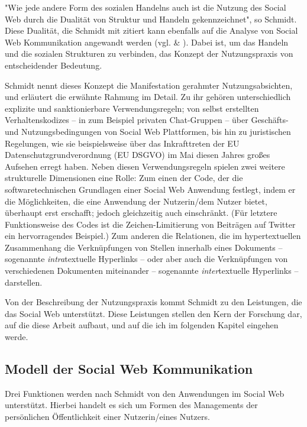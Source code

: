 "Wie jede andere Form des sozialen Handelns auch ist die Nutzung des Social Web durch die Dualität von Struktur und Handeln gekennzeichnet", so Schmidt. Diese Dualität, die Schmidt mit \cite{giddens1988konstitution} zitiert kann ebenfalls auf die Analyse von Social Web Kommunikation angewandt werden (vgl. \cite{schmidt2006social} \& \cite{schmidt2006weblogs}). Dabei ist, um das Handeln und die sozialen Strukturen zu verbinden, das Konzept der Nutzungspraxis von entscheidender Bedeutung.

Schmidt nennt dieses Konzept die Manifestation gerahmter Nutzungsabsichten, und erläutert die erwähnte Rahmung im Detail. Zu ihr gehören unterschiedlich explizite und sanktionierbare Verwendungsregeln; von selbst erstellten Verhaltenskodizes -- in zum Beispiel privaten Chat-Gruppen -- über Geschäfts- und Nutzungsbedingungen von Social Web Plattformen, bis hin zu juristischen Regelungen, wie sie beispielsweise über das Inkrafttreten der EU Datenschutzgrundverordnung (EU DSGVO) \cite{eurlex2016} im Mai diesen Jahres großes Aufsehen erregt haben. Neben diesen Verwendungsregeln spielen zwei weitere strukturelle Dimensionen eine Rolle: Zum einen der Code, der die softwaretechnischen Grundlagen einer Social Web Anwendung festlegt, indem er die Möglichkeiten, die eine Anwendung der Nutzerin/dem Nutzer bietet, überhaupt erst erschafft; jedoch gleichzeitig auch einschränkt. (Für letztere Funktionsweise des Codes ist die Zeichen-Limitierung von Beiträgen auf Twitter ein hervorragendes Beispiel.) Zum anderen die Relationen, die im hypertextuellen Zusammenhang die Verknüpfungen von Stellen innerhalb eines Dokuments -- sogenannte \textit{intra}textuelle Hyperlinks -- oder aber auch die Verknüpfungen von verschiedenen Dokumenten miteinander -- sogenannte \textit{inter}textuelle Hyperlinks -- darstellen.

Von der Beschreibung der Nutzungspraxis kommt Schmidt zu den Leistungen, die das Social Web unterstützt. Diese Leistungen stellen den Kern der Forschung dar, auf die diese Arbeit aufbaut, und auf die ich im folgenden Kapitel eingehen werde.

\subsection{Modell der Social Web Kommunikation}
\label{sec:jhsforschung}

Drei Funktionen werden nach Schmidt von den Anwendungen im Social Web unterstützt. Hierbei handelt es sich um Formen des Managements der persönlichen Öffentlichkeit einer Nutzerin/eines Nutzers. 

